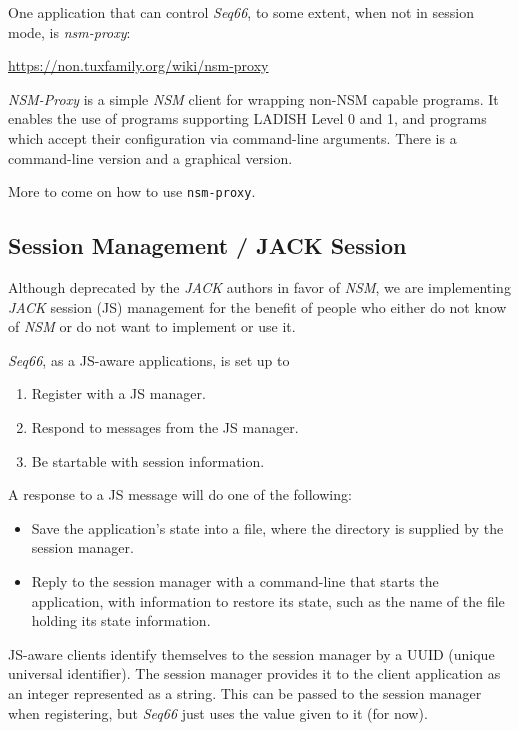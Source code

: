    One application that can control \textsl{Seq66}, to some extent, when not in
   session mode, is \textsl{nsm-proxy}:

      \url{https://non.tuxfamily.org/wiki/nsm-proxy}

   \textsl{NSM-Proxy} is a simple \textsl{NSM} client for wrapping non-NSM
   capable programs. It enables the use of programs supporting LADISH Level 0
   and 1, and programs which accept their configuration via command-line
   arguments.  There is a command-line version and a graphical version.

   More to come on how to use \texttt{nsm-proxy}.

\subsection{Session Management / JACK Session}
\label{subsec:sessions_jack}

   Although deprecated by the \textsl{JACK} authors in favor of \textsl{NSM},
   we are implementing \textsl{JACK} session (JS) management for the benefit of
   people who either do not know of \textsl{NSM} or do not want to implement or
   use it.

   \textsl{Seq66}, as a JS-aware applications, is set up to

   \begin{enumerate}
      \item Register with a JS manager.
      \item Respond to messages from the JS manager.
      \item Be startable with session information.
   \end{enumerate}

   A response to a JS message will do one of the following:

   \begin{itemize}
      \item Save the application's state into a file, where the directory is
         supplied by the session manager.
      \item Reply to the session manager with a command-line that starts the
         application, with information to restore its state, such as
         the name of the file holding its state information.
   \end{itemize}

	JS-aware clients identify themselves to the session manager by a UUID
	(unique universal identifier). The session manager provides it to
	the client application as an integer represented as a string.
   This can be passed to the session manager when registering, but
   \textsl{Seq66} just uses the value given to it (for now).

